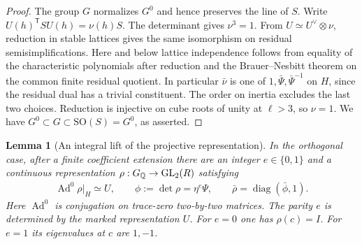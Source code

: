 \documentclass[a4paper,11pt]{article}
\newtheorem{lemma}[proposition]{Lemma}
\theoremstyle{definition}
\theoremstyle{remark}
\numberwithin{equation}{section}
\begin{document}
\begin{proof}
The group \(G\) normalizes \(G^0\) and hence preserves the
line of \(S\). Write \(U(h)^{\mathsf T}SU(h)=\nu(h)S\).
The determinant gives \(\nu^3=1\). From
\(U\simeq U^\vee\otimes\nu\), reduction in stable lattices
gives the same isomorphism on residual semisimplifications.
Here and below lattice independence follows from equality of
the characteristic polynomials after reduction and the
Brauer--Nesbitt theorem on the common finite residual quotient.
In particular \(\bar\nu\) is one of \(1,\bar\Psi,\bar\Psi^{-1}\)
on \(H\), since the residual dual has a trivial constituent.
The order on inertia excludes the last two choices. Reduction
is injective on cube roots of unity at \(\ell>3\), so
\(\nu=1\). We have \(G^0\subset G\subset\mathrm{SO}(S)=G^0\),
as asserted.
\end{proof}

\begin{lemma}[An integral lift of the projective representation]
\label{lem:spin122}
In the orthogonal case, after a finite coefficient extension
there are an integer \(e\in\{0,1\}\) and a continuous
representation \(\rho:G_\mathbb Q\to\mathrm{GL}_2(R)\) satisfying
\begin{gather}
 \operatorname{Ad}^0\rho|_H\simeq U,\qquad
 \phi:=\det\rho=\eta^e\Psi,\qquad
 \bar\rho=\operatorname{diag}(\bar\phi,1).                 \label{eq:spin122}
\end{gather}
Here \(\operatorname{Ad}^0\) is conjugation on trace-zero
two-by-two matrices. The parity \(e\) is determined by the
marked representation \(U\). For \(e=0\) one has \(\rho(c)=I\).
For \(e=1\) its eigenvalues at \(c\) are \(1,-1\).
\end{lemma}
\end{document}
